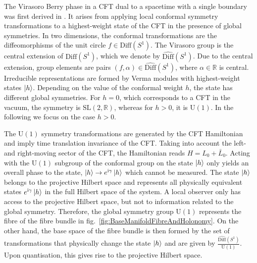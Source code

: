 \documentclass[a4paper,11pt]{article}
\renewcommand{\i}{\text{i}}
\newcommand{\U}{\text{U}}
\newcommand{\1}{\mathds{1}}
\begin{document}
The Virasoro Berry phase in a CFT dual to a spacetime with a single boundary was first derived in \cite{Oblak:2017ect}. It arises from applying local conformal symmetry transformations to a highest-weight state of the CFT in the presence of global symmetries. In two dimensions, the conformal transformations are the diffeomorphisms of the unit circle $f\in\text{Diff}(S^1)$. The Virasoro group is the central extension of $\text{Diff}(S^1)$, which we denote by $\widehat{\text{Diff}}(S^1)$. Due to the central extension, group elements are pairs $(f,\alpha)\in\widehat{\text{Diff}}(S^1)$, where $\alpha\in\mathds R$ is central. Irreducible representations are formed by Verma modules with highest-weight states $\ket{h}$. Depending on the value of the conformal weight $h$, the state has different global symmetries. For $h=0$, which corresponds to a CFT in the vacuum, the symmetry is $\text{SL}(2,\mathds{R})$, whereas for $h>0$, it is $\U(1)$. In the following we focus on the case $h>0$.

The $\U(1)$ symmetry transformations are generated by the CFT Hamiltonian and imply time translation invariance of the CFT. Taking into account the left- and right-moving sector of the CFT, the Hamiltonian reads $H=L_0+\bar{L}_0$. Acting with the $\U(1)$ subgroup of the conformal group on the state $\ket{h}$ only yields an overall phase to the state, $\ket{h}\rightarrow e^{\i\gamma}\ket{h}$ which cannot be measured. The state $\ket{h}$ belongs to the projective Hilbert space and represents all physically equivalent states $e^{\i\gamma}\ket{h}$ in the full Hilbert space of the system. A local observer only has access to the projective Hilbert space, but not to information related to the global symmetry. Therefore, the global symmetry group $\U(1)$ represents the fibre of the fibre bundle in fig.~\ref{fig:BaseManifoldFibreAndHolonomy}. On the other hand, the base space of the fibre bundle is then formed by the set of transformations that physically change the state $\ket{h}$ and are given by $\frac{\widehat{\text{Diff}}(S^1)}{\U(1)}$. Upon quantisation, this gives rise to the projective Hilbert space.
\end{document}
